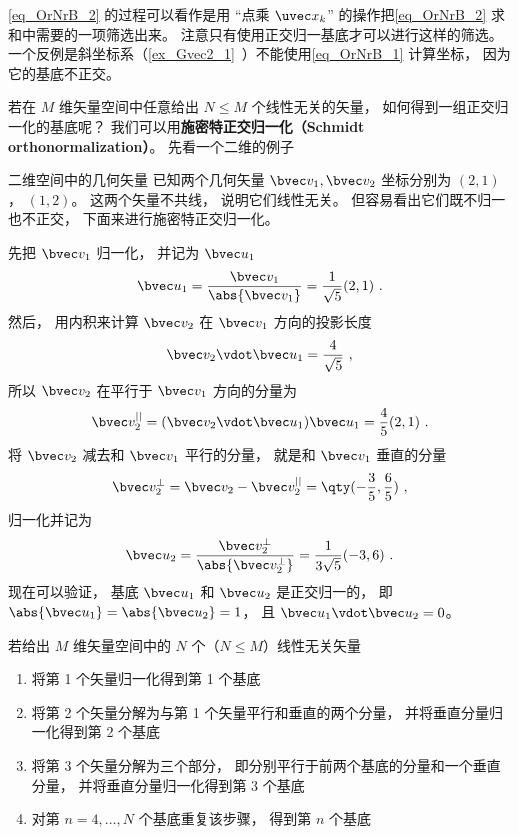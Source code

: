 \autoref{eq_OrNrB_2} 的过程可以看作是用 “点乘 $\uvec x_k$” 的操作把\autoref{eq_OrNrB_2} 求和中需要的一项筛选出来。 注意只有使用正交归一基底才可以进行这样的筛选。 一个反例是斜坐标系（\autoref{ex_Gvec2_1}~）不能使用\autoref{eq_OrNrB_1} 计算坐标， 因为它的基底不正交。



若在 $M$ 维矢量空间中任意给出 $N \leqslant M$ 个线性无关的矢量， 如何得到一组正交归一化的基底呢？ 我们可以用\textbf{施密特正交归一化（Schmidt orthonormalization）}。 先看一个二维的例子

\begin{example}{二维空间中的几何矢量}
已知两个几何矢量 $\bvec v_1, \bvec v_2$ 坐标分别为 $(2, 1)$， $(1, 2)$。 这两个矢量不共线， 说明它们线性无关。 但容易看出它们既不归一也不正交， 下面来进行施密特正交归一化。

先把 $\bvec v_1$ 归一化， 并记为 $\bvec u_1$
\begin{equation}
\bvec u_1 = \frac{\bvec v_1}{\abs{\bvec v_1}} = \frac{1}{\sqrt{5}} (2, 1)~.
\end{equation}
然后， 用内积来计算 $\bvec v_2$ 在 $\bvec v_1$ 方向的投影长度
\begin{equation}
\bvec v_2 \vdot \bvec u_1 = \frac{4}{\sqrt{5}}~,
\end{equation}
所以 $\bvec v_2$ 在平行于 $\bvec v_1$ 方向的分量为
\begin{equation}
\bvec v_2^{||} =  (\bvec v_2 \vdot \bvec u_1)\bvec u_1 = \frac{4}{5} (2, 1)~.
\end{equation}
将 $\bvec v_2$ 减去和 $\bvec v_1$ 平行的分量， 就是和 $\bvec v_1$ 垂直的分量
\begin{equation}
\bvec v_2^\bot = \bvec v_2 - \bvec v_2^{||} = \qty(-\frac35, \frac65)~,
\end{equation}
归一化并记为
\begin{equation}
\bvec u_2 = \frac{\bvec v_2^\bot}{\abs{\bvec v_2^\bot}} = \frac{1}{3\sqrt{5}} (-3, 6)~.
\end{equation}
现在可以验证， 基底 $\bvec u_1$ 和 $\bvec u_2$ 是正交归一的， 即 $\abs{\bvec u_1} = \abs{\bvec u_2} = 1$， 且 $\bvec u_1 \vdot \bvec u_2 = 0$。
\end{example}

若给出 $M$ 维矢量空间中的 $N$ 个（$N \leqslant M$）线性无关矢量
\begin{enumerate}
\item 将第 1 个矢量归一化得到第 1 个基底
\item 将第 2 个矢量分解为与第 1 个矢量平行和垂直的两个分量， 并将垂直分量归一化得到第 2 个基底
\item 将第 3 个矢量分解为三个部分， 即分别平行于前两个基底的分量和一个垂直分量， 并将垂直分量归一化得到第 3 个基底
\item 对第 $n = 4, \dots , N$ 个基底重复该步骤， 得到第 $n$ 个基底
\end{enumerate}

